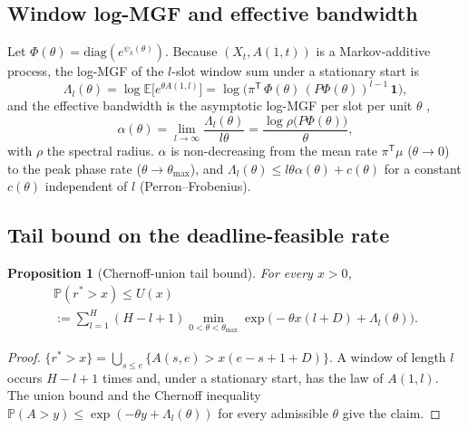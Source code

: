\documentclass[journal]{IEEEtran}
\newtheorem{proposition}{Proposition}
\newcommand{\rstar}{r^{\ast}}
\newcommand{\E}{\mathbb{E}}
\newcommand{\Prob}{\mathbb{P}}
\begin{document}
\subsection{Window log-MGF and effective bandwidth}
Let $\Phi(\theta) = \mathrm{diag}(e^{\psi_k(\theta)})$. Because $(X_t, A(1, t))$ is a Markov-additive process, the log-MGF of the $l$-slot window sum under a stationary start is
\begin{equation}
\Lambda_l(\theta) = \log\E\big[e^{\theta A(1, l)}\big] = \log\big(\pi^{\mathsf T}\,\Phi(\theta)\,(P\Phi(\theta))^{l - 1}\,\mathbf 1\big),
\label{eq:window_mgf}
\end{equation}
and the effective bandwidth is the asymptotic log-MGF per slot per unit $\theta$ \cite{kesidis1993,chang1994},
\begin{equation}
\alpha(\theta) = \lim_{l \to \infty} \frac{\Lambda_l(\theta)}{l\theta} = \frac{\log\rho\big(P\Phi(\theta)\big)}{\theta},
\label{eq:eb}
\end{equation}
with $\rho$ the spectral radius. $\alpha$ is non-decreasing from the mean rate $\pi^{\mathsf T}\mu$ ($\theta \to 0$) to the peak phase rate ($\theta \to \theta_{\max}$), and $\Lambda_l(\theta) \le l\theta\alpha(\theta) + c(\theta)$ for a constant $c(\theta)$ independent of $l$ (Perron--Frobenius).

\subsection{Tail bound on the deadline-feasible rate}
\begin{proposition}[Chernoff-union tail bound]
\label{prop:union}
For every $x > 0$,
\begin{multline}
\Prob(\rstar > x) \le U(x) \\ := \sum_{l = 1}^{H} (H - l + 1) \min_{0 < \theta < \theta_{\max}} \exp\big(-\theta x (l + D) + \Lambda_l(\theta)\big).
\label{eq:union}
\end{multline}
\end{proposition}
\begin{proof}
$\{\rstar > x\} = \bigcup_{s \le e}\{A(s, e) > x(e - s + 1 + D)\}$. A window of length $l$ occurs $H - l + 1$ times and, under a stationary start, has the law of $A(1, l)$. The union bound and the Chernoff inequality $\Prob(A > y) \le \exp(-\theta y + \Lambda_l(\theta))$ for every admissible $\theta$ give the claim.
\end{proof}
\end{document}
